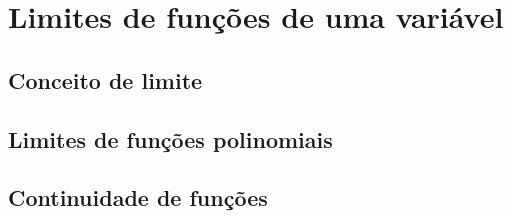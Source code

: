 
\chapter{Limites de funções de uma variável}\label{limites}
\section{Conceito de limite}
\section{Limites de funções polinomiais}
\section{Continuidade de funções}
